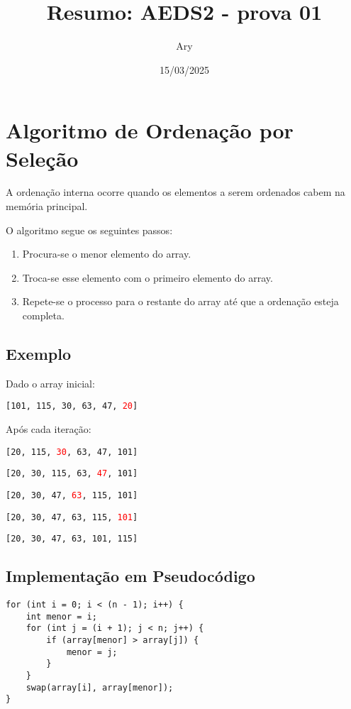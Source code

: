 \documentclass{article}
\title{Resumo: AEDS2 - prova 01}
\author{Ary}
\date{15/03/2025}
\begin{document}
\maketitle

\section{Algoritmo de Ordenação por Seleção}
A ordenação interna ocorre quando os elementos a serem ordenados cabem na memória principal.

O algoritmo segue os seguintes passos:
\begin{enumerate}
    \item Procura-se o menor elemento do array.
    \item Troca-se esse elemento com o primeiro elemento do array.
    \item Repete-se o processo para o restante do array até que a ordenação esteja completa.
\end{enumerate}

\subsection{Exemplo}
Dado o array inicial:
\begin{center}
    \texttt{[101, 115, 30, 63, 47, \textcolor{red}{20}]}
\end{center}
Após cada iteração:
\begin{center}
    \texttt{[20, 115, \textcolor{red}{30}, 63, 47, 101]}
\end{center}
\begin{center}
    \texttt{[20, 30, 115, 63, \textcolor{red}{47}, 101]}
\end{center}
\begin{center}
    \texttt{[20, 30, 47, \textcolor{red}{63}, 115, 101]}
\end{center}
\begin{center}
    \texttt{[20, 30, 47, 63, 115, \textcolor{red}{101}]}
\end{center}
\begin{center}
    \texttt{[20, 30, 47, 63, 101, 115]}
\end{center}

\subsection{Implementação em Pseudocódigo}
\begin{verbatim}
for (int i = 0; i < (n - 1); i++) {
    int menor = i; 
    for (int j = (i + 1); j < n; j++) {
        if (array[menor] > array[j]) {
            menor = j;
        }
    }
    swap(array[i], array[menor]);
}
\end{verbatim}
\end{document}
